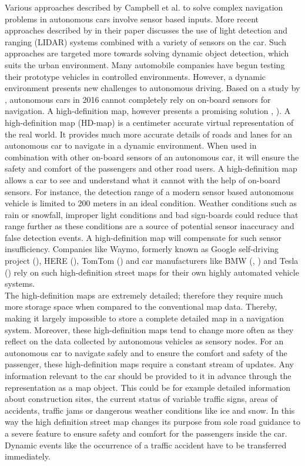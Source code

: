 Various approaches described by Campbell et al. to solve complex navigation problems in autonomous cars involve sensor based inputs. More recent approaches described by \citet{levinson2011towards} in their paper discusses the use of light detection and ranging (LIDAR) systems combined with a variety of sensors on the car. Such approaches are targeted more towards solving dynamic object detection, which suits the urban environment. Many automobile companies have begun testing their prototype vehicles in controlled environments. However, a dynamic environment presents new challenges to autonomous driving. Based on a study by \citet{aeberhard2015experience}, autonomous cars in 2016 cannot completely rely on on-board sensors for navigation. A high-definition map, however presents a promising solution  \cite{360hdmaps}, \cite{hdmapauto}). A high-definition map (HD-map) is a centimeter accurate virtual representation of the real world. It provides much more accurate details of roads and lanes for an autonomous car to navigate in a dynamic environment. When used in combination with other on-board sensors of an autonomous car, it will ensure the safety and comfort of the passengers and other road users. A high-definition map allows a car to see and understand what it cannot with the help of on-board sensors. For instance, the detection range of a modern sensor based autonomous vehicle is limited to 200 meters in an ideal condition. Weather conditions such as rain or snowfall, improper light conditions and bad sign-boards could reduce that range further as these conditions are a source of potential sensor inaccuracy and false detection events. A high-definition map will compensate for such sensor insufficiency. Companies like Waymo, formerly known as Google self-driving project (\citet{madrigal}), HERE (\citet{stevenson}), TomTom (\cite{tomtom}) and car manufacturers like BMW (\citet{bender2014lanelets}, \citet{aeberhard2015experience}) and Tesla (\citet{perkins}) rely on such high-definition street maps for their own highly automated vehicle systems. \\


The high-definition maps are extremely detailed; therefore they require much more storage space when compared to the conventional map data. Thereby, making it largely impossible to store a complete detailed map in a navigation system. Moreover, these high-definition maps tend to change more often as they reflect on the data collected by autonomous vehicles as sensory nodes. For an autonomous car to navigate safely and to ensure the comfort and safety of the passenger, these high-definition maps require a constant stream of updates. Any information relevant to the car should be provided to it in advance through the representation as a map object. This could be for example detailed information about construction sites, the current status of variable traffic signs, areas of accidents, traffic jams or dangerous weather conditions like ice and snow. In this way the high definition street map changes its purpose from sole road guidance to a severe feature to ensure safety and comfort for the passengers inside the car. Dynamic events like the occurrence of a traffic accident have to be transferred immediately. \\ 
 
